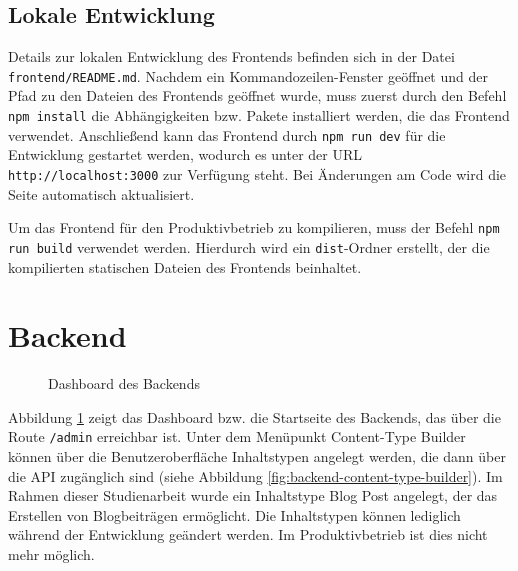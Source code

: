 %
%
\subsection{Lokale Entwicklung}

Details zur lokalen Entwicklung des Frontends befinden sich in der Datei \glqq \lstinline{frontend/README.md}\grqq{}. Nachdem ein Kommandozeilen-Fenster geöffnet und der Pfad zu den Dateien des Frontends geöffnet wurde, muss zuerst durch den Befehl \glqq \lstinline{npm install}\grqq{} die Abhängigkeiten bzw. Pakete installiert werden, die das Frontend verwendet. Anschließend kann das Frontend durch \glqq \lstinline{npm run dev}\grqq{} für die Entwicklung gestartet werden, wodurch es unter der URL \glqq \lstinline{http://localhost:3000}\grqq{} zur Verfügung steht. Bei Änderungen am Code wird die Seite automatisch aktualisiert.

Um das Frontend für den Produktivbetrieb zu kompilieren, muss der Befehl \glqq \lstinline{npm run build}\grqq{} verwendet werden. Hierdurch wird ein \glqq \lstinline{dist}\grqq{}-Ordner erstellt, der die kompilierten statischen Dateien des Frontends beinhaltet.

\section{Backend}
\label{sec:struktur-backend}

\begin{figure}[H]
  \setlength{\fboxsep}{0pt}
  \setlength{\fboxrule}{0.5pt}
  \centering
  \caption[Dashboard des Backends]{Dashboard des Backends}
  \label{fig:backend-dashboard}
\end{figure}

Abbildung \ref{fig:backend-dashboard} zeigt das Dashboard bzw. die Startseite des Backends, das über die Route \lstinline{/admin} erreichbar ist. Unter dem Menüpunkt \glqq Content-Type Builder\grqq{} können über die Benutzeroberfläche Inhaltstypen angelegt werden, die dann über die API zugänglich sind (siehe Abbildung \ref{fig:backend-content-type-builder}). Im Rahmen dieser Studienarbeit wurde ein Inhaltstype \glqq Blog Post\grqq{} angelegt, der das Erstellen von Blogbeiträgen ermöglicht. Die Inhaltstypen können lediglich während der Entwicklung geändert werden. Im Produktivbetrieb ist dies nicht mehr möglich.

